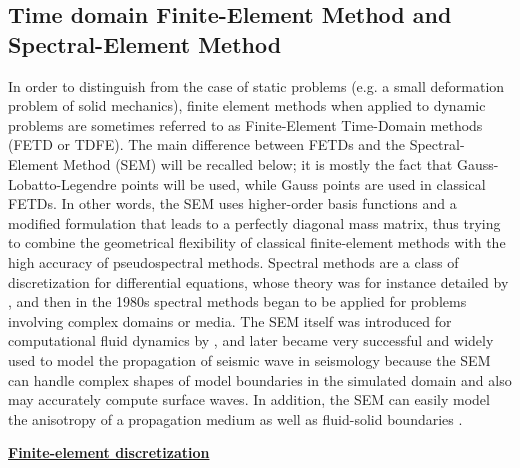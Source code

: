     \subsection{Time domain Finite-Element Method and Spectral-Element Method}
    \label{ssec:sem}

        In order to distinguish from the case of static problems (e.g. a small deformation problem of solid mechanics), finite element methods when applied to dynamic problems
are sometimes referred to as Finite-Element Time-Domain methods (FETD or TDFE).
        The main difference between FETDs and the Spectral-Element Method (SEM) will be recalled below; it is mostly the fact that Gauss-Lobatto-Legendre points will be used,
while Gauss points are used in classical FETDs.
In other words, the SEM uses higher-order basis functions and a modified formulation that leads to a perfectly diagonal mass matrix, thus trying to combine the geometrical
flexibility of classical finite-element methods with the high accuracy of pseudospectral methods.
        Spectral methods are a class of discretization for differential equations, whose theory was for instance detailed by
\textcite{Gottlieb1977Numericalanalysisof}, and then in the 1980s spectral methods began to be applied for problems involving complex domains or media.
The SEM itself was introduced for computational fluid dynamics by \textcite{Patera1984Aspectralelement}, and later became very successful and widely used to
model the propagation of seismic wave in seismology \citep{KoTr99,Fic10,Peter2011Forwardandadjoint}
because the SEM can handle complex shapes of model boundaries in the simulated domain and also may
accurately compute surface waves. In addition, the SEM can easily model the anisotropy of a propagation medium \parencite{Komatitsch2000Simulationofanisotropic} as well as
fluid-solid boundaries \parencite{Komatitsch2000Wavepropagationnear}.

\clearpage
\noindent
        \underline{\textbf{Finite-element discretization}}


